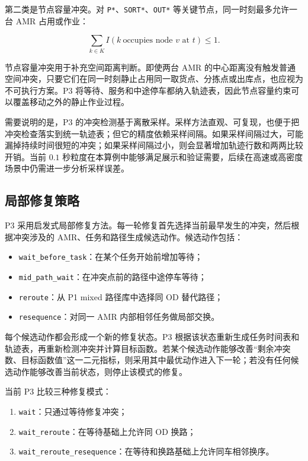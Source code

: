 第二类是节点容量冲突。对 \verb|P*|、\verb|SORT*|、\verb|OUT*| 等关键节点，同一时刻最多允许一台 AMR 占用或作业：

\[
\sum_{k\in K}I(k\ \text{occupies node }v\text{ at }t)\le 1.
\]

节点容量冲突用于补充空间距离判断。即使两台 AMR 的中心距离没有触发普通空间冲突，只要它们在同一时刻静止占用同一取货点、分拣点或出库点，也应视为不可执行方案。P3 将等待、服务和中途停车都纳入轨迹表，因此节点容量约束可以覆盖移动之外的静止作业过程。

需要说明的是，P3 的冲突检测基于离散采样。采样方法直观、可复现，也便于把冲突检查落实到统一轨迹表；但它的精度依赖采样间隔。如果采样间隔过大，可能漏掉持续时间很短的冲突；如果采样间隔过小，则会显著增加轨迹行数和两两比较开销。当前 $0.1$ 秒粒度在本算例中能够满足展示和验证需要，后续在高速或高密度场景中仍需进一步分析采样误差。

\subsection{局部修复策略}

P3 采用启发式局部修复方法。每一轮修复首先选择当前最早发生的冲突，然后根据冲突涉及的 AMR、任务和路径生成候选动作。候选动作包括：

\begin{itemize}
  \item \verb|wait_before_task|：在某个任务开始前增加等待；
  \item \verb|mid_path_wait|：在冲突点前的路径中途停车等待；
  \item \verb|reroute|：从 P1 mixed 路径库中选择同 OD 替代路径；
  \item \verb|resequence|：对同一 AMR 内部相邻任务做局部交换。
\end{itemize}

每个候选动作都会形成一个新的修复状态。P3 根据该状态重新生成任务时间表和轨迹表，再重新检测冲突并计算目标函数。若某个候选动作能够改善“剩余冲突数、目标函数值”这一二元指标，则采用其中最优动作进入下一轮；若没有任何候选动作能够改善当前状态，则停止该模式的修复。

当前 P3 比较三种修复模式：

\begin{enumerate}
  \item \verb|wait|：只通过等待修复冲突；
  \item \verb|wait_reroute|：在等待基础上允许同 OD 换路；
  \item \verb|wait_reroute_resequence|：在等待和换路基础上允许同车相邻换序。
\end{enumerate}


